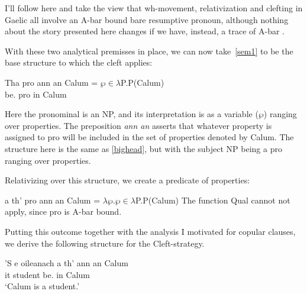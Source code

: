 \documentclass[output=paper]{langsci/langscibook}
\begin{document}
I'll follow \citet{adger-ramchand:05,Adger2011} here and
take the view that wh-movement, relativization and clefting in Gaelic all
involve an A-bar bound bare resumptive pronoun, although nothing about the
story presented here changes if we have, instead, a trace of A-bar .

With these two analytical premisses in place, we can
now take~\eqref{sem1} to be the base structure to which the cleft applies:

\ea \label{sem1} \gll  Tha pro {ann an} Calum = $\wp \in \lambda$P.P(Calum)\\
be.\Prs{} pro in Calum\\
\z

Here the pronominal is an NP, and its interpretation is as a variable ($\wp$) ranging over properties. The preposition \emph{ann an} asserts that whatever property is assigned to pro will be included in the set of properties denoted by Calum. The structure here is the same as \eqref{bighead}, but with the subject NP being a pro ranging over properties.

Relativizing over this structure, we create a predicate of properties:

\ea a th' pro {ann an} Calum = $\lambda \wp$.$\wp \in \lambda$P.P(Calum) \z
The function Qual cannot not apply, since pro is A-bar bound.

Putting this outcome together with the analysis I motivated for copular
clauses, we derive the following structure for the Cleft-strategy.

\ea {}
\sn \gll  'S e oileanach a th' {ann an} Calum\\
\Cop{} it student \Rel{} be.\Prs{} in Calum\\
\glt \enquote*{Calum is a student.}
\z
\end{document}
